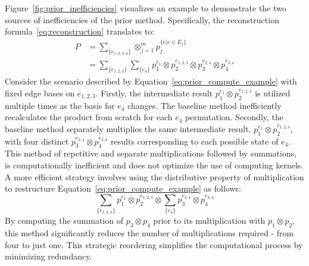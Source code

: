 Figure~\ref{fig:prior_inefficiencies} visualizes an example to demonstrate the two sources of inefficiencies of the prior method.
Specifically, the reconstruction formula~\ref{eq:reconstruction} translates to:
\begin{align}
    P&=\sum_{\{e_{1,2,3,4}\}}\otimes_{j=1}^{m}p_j^{\{e|e\in E_j\}}\nonumber\\
    &=\sum_{\{e_{1,2,3}\}}\sum_{\{e_4\}}p_1^{e_1}\otimes p_2^{e_{1,2,3}}\otimes p_3^{e_{2,4}}\otimes p_4^{e_{3,4}}\label{eq:prior_compute_example}
\end{align}
Consider the scenario described by Equation~\ref{eq:prior_compute_example} with fixed edge bases on $e_{1,2,3}$.
Firstly, the intermediate result $p_1^{e_1}\otimes p_2^{e_{1,2,3}}$ is utilized multiple times as the basis for $e_4$ changes.
The baseline method inefficiently recalculates the product from scratch for each $e_4$ permutation.
Secondly, the baseline method separately multiplies the same intermediate result, $p_1^{e_1}\otimes p_2^{e_{1,2,3}}$,
with four distinct $p_3^{e_{2,4}}\otimes p_4^{e_{3,4}}$ results corresponding to each possible state of $e_4$.
This method of repetitive and separate multiplications followed by summations,
is computationally inefficient and does not optimize the use of computing kernels.
A more efficient strategy involves using the distributive property of multiplication to restructure Equation~\ref{eq:prior_compute_example} as follows:
\begin{equation}
    \sum_{\{e_{1,2,3}\}}p_1^{e_1}\otimes p_2^{e_{1,2,3}}\otimes\sum_{\{e_4\}}p_3^{e_{2,4}}\otimes p_4^{e_{3,4}}
\end{equation}
By computing the summation of $p_3 \otimes p_4$ prior to its multiplication with $p_1 \otimes p_2$,
this method significantly reduces the number of multiplications required - from four to just one.
This strategic reordering simplifies the computational process by minimizing redundancy.